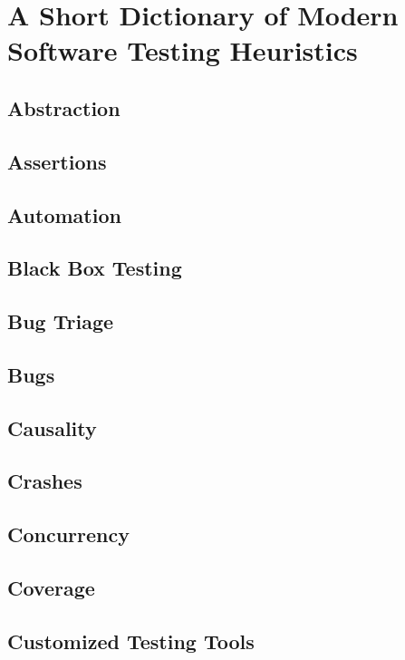 \part{A Short Dictionary of Modern Software Testing Heuristics}

\chapter{Abstraction}

\chapter{Assertions}

\chapter{Automation}

\chapter{Black Box Testing}

\chapter{Bug Triage}

\chapter{Bugs}

\chapter{Causality}

\chapter{Crashes}

\chapter{Concurrency}

\chapter{Coverage}

\chapter{Customized Testing Tools}

